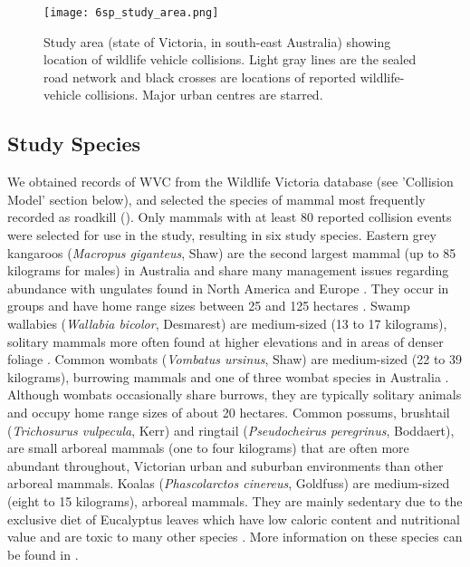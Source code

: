\begin{figure*}[htp]
  \centering
  \texttt{[image: 6sp\_study\_area.png]}
  \caption[Wildlife-vehicle collisions in Victoria]{Study area (state of Victoria, in south-east Australia) showing location of wildlife vehicle collisions. Light gray lines are the sealed road network and black crosses are locations of reported wildlife-vehicle collisions. Major urban centres are starred.}
  \label{6sp_study_area}
\end{figure*}

\subsection{Study Species}

We obtained records of WVC from the Wildlife Victoria database (see 'Collision Model' section below), and selected the species of mammal most frequently recorded as roadkill (). Only mammals with at least 80 reported collision events were selected for use in the study, resulting in six study species.  Eastern grey kangaroos (\textit{Macropus giganteus}, Shaw) are the second largest mammal (up to 85 kilograms for males) in Australia and share many management issues regarding abundance with ungulates found in North America and Europe \citep{crof04,coul10}. They occur in groups and have home range sizes between 25 and 125 hectares \citep{daws12}.  Swamp wallabies (\textit{Wallabia bicolor}, Desmarest) are medium-sized (13 to 17 kilograms), solitary mammals more often found at higher elevations and in areas of denser foliage \citep{vand08}. Common wombats (\textit{Vombatus ursinus}, Shaw) are medium-sized (22 to 39 kilograms), burrowing mammals and one of three wombat species in Australia \citep{vand08}. Although wombats occasionally share burrows, they are typically solitary animals and occupy home range sizes of about 20 hectares. Common possums, brushtail (\textit{Trichosurus vulpecula}, Kerr) and ringtail (\textit{Pseudocheirus peregrinus}, Boddaert), are small arboreal mammals (one to four kilograms) that are often more abundant throughout, Victorian urban and suburban environments than other arboreal mammals.  Koalas (\textit{Phascolarctos cinereus}, Goldfuss) are medium-sized (eight to 15 kilograms), arboreal mammals.  They are mainly sedentary due to the exclusive diet of Eucalyptus leaves which have low caloric content and nutritional value and are toxic to many other species \citep{vand08}. More information on these species can be found in .

